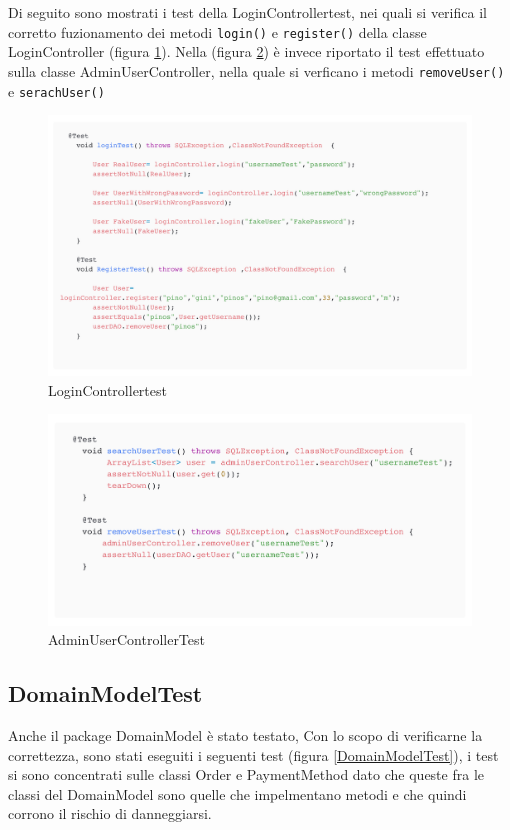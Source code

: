 \documentclass{article}
\begin{document}
Di seguito sono mostrati i test della LoginControllertest, nei quali
si verifica il corretto fuzionamento dei metodi \texttt{login()} e \texttt{register()} della classe LoginController (figura \ref{LoginControllertest}). Nella  (figura \ref{AdminUserControllerTest}) è invece riportato il test effettuato sulla classe AdminUserController, nella quale si verficano i metodi \texttt{removeUser()} e \texttt{serachUser()}


\begin{figure}[!h]
    \centering
    \includegraphics[width=1.0\linewidth]{imgs/snippets/testLogin.png}
    \caption{LoginControllertest}
    \label{LoginControllertest}
\end{figure}


\begin{figure}[!h]
    \centering
    \includegraphics[width=1.0\linewidth]{imgs/snippets/AdminUserControllerTest.png}
    \caption{AdminUserControllerTest}
    \label{AdminUserControllerTest}
\end{figure}

\newpage


\subsection{DomainModelTest}
Anche il package DomainModel è stato testato, Con lo scopo di verificarne la correttezza, sono stati eseguiti i seguenti test (figura \ref{DomainModelTest}), i test si sono concentrati sulle classi Order e PaymentMethod dato che queste fra le classi del DomainModel sono quelle che impelmentano metodi e che quindi corrono il rischio di danneggiarsi.
\end{document}
